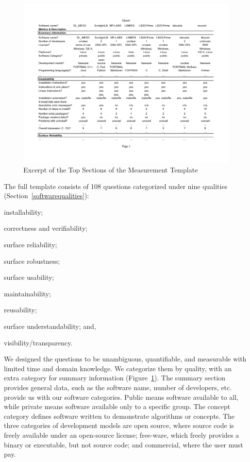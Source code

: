 \documentclass[final, 3p, times, authoryear]{elsarticle}
\begin{document}
\begin{figure}[!ht]
	\begin{center}
	  \includegraphics[width=1.0\textwidth]{./figures/measurement_template.pdf}
	  \caption{Excerpt of the Top Sections of the Measurement Template}
	  \label{measurement_template_image}
	\end{center}
\end{figure}

The full template consists of 108 questions categorized under nine qualities
(Section~\ref{softwarequalities}):
\begin{inparaenum}[(i)]
	\item installability;
	\item correctness and verifiability;
	\item surface reliability;
	\item surface robustness;
	\item surface usability;
	\item maintainability;
	\item reusability;
	\item surface understandability; and,
	\item visibility/transparency. 
\end{inparaenum} 

We designed the questions to be unambiguous, quantifiable, and measurable with
limited time and domain knowledge. We categorize them by quality, with an extra
category for summary information (Figure~\ref{measurement_template_image}). The
summary section provides general data, such as the software name, number of
developers, etc. \citet{gewaltig2012quality} provide us with our software
categories. Public means software available to all, while private means software
available only to a specific group.  The concept category defines software
written to demonstrate algorithms or concepts. The three categories of
development models are open source, where source code is freely available under
an open-source license; free-ware, which freely provides a binary or executable,
but not source code; and commercial, where the user must pay. 
\end{document}
